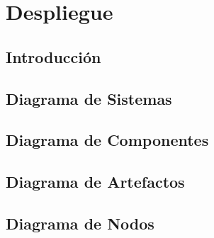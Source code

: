 \chapter{Despliegue}

\section{Introducción}

\newpage

\section{Diagrama de Sistemas}

\newpage

\section{Diagrama de Componentes}

\newpage

\section{Diagrama de Artefactos}

\newpage

\section{Diagrama de Nodos}

\newpage


